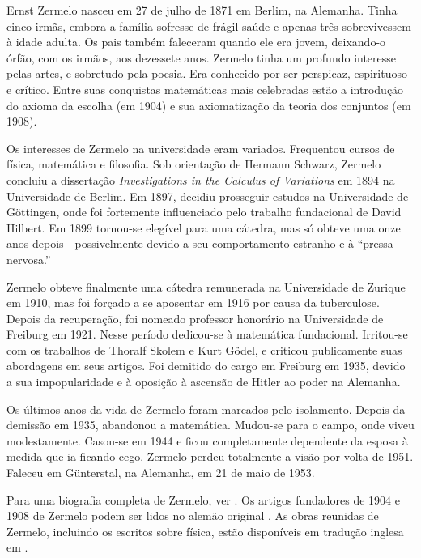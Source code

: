 \documentclass[../../../include/open-logic-section]{subfiles}
\begin{document}



Ernst Zermelo nasceu em 27 de julho de 1871 em Berlim, na Alemanha.
Tinha cinco irmãs, embora a família sofresse de frágil saúde e apenas
três sobrevivessem à idade adulta. Os pais também faleceram quando ele
era jovem, deixando-o órfão, com os irmãos, aos dezessete anos.
Zermelo tinha um profundo interesse pelas artes, e sobretudo pela
poesia. Era conhecido por ser perspicaz, espirituoso e crítico. Entre
suas conquistas matemáticas mais celebradas estão a introdução do
axioma da escolha (em 1904) e sua axiomatização da teoria dos
conjuntos (em 1908).

Os interesses de Zermelo na universidade eram variados. Frequentou
cursos de física, matemática e filosofia. Sob orientação de Hermann
Schwarz, Zermelo concluiu a dissertação \emph{Investigations in the
  Calculus of Variations} em 1894 na Universidade de Berlim. Em 1897,
decidiu prosseguir estudos na Universidade de G\"{o}ttingen, onde foi
fortemente influenciado pelo trabalho fundacional de David Hilbert.
Em 1899 tornou-se elegível para uma cátedra, mas só obteve uma onze
anos depois---possivelmente devido a seu comportamento estranho e à
``pressa nervosa.''

Zermelo obteve finalmente uma cátedra remunerada na Universidade de
Zurique em 1910, mas foi forçado a se aposentar em 1916 por causa da
tuberculose. Depois da recuperação, foi nomeado professor honorário na Universidade
de Freiburg em 1921. Nesse período
dedicou-se à matemática fundacional.  Irritou-se com os trabalhos de
Thoralf Skolem e Kurt G\"{o}del, e criticou publicamente suas
abordagens em seus artigos.  Foi demitido do cargo em Freiburg em
1935, devido a sua impopularidade e à oposição à ascensão de Hitler
ao poder na Alemanha.
 
Os últimos anos da vida de Zermelo foram marcados pelo isolamento.
Depois da demissão em 1935, abandonou a matemática. Mudou-se para
o campo, onde viveu modestamente. Casou-se em 1944 e ficou completamente
dependente da esposa à medida que ia ficando cego. Zermelo perdeu
totalmente a visão por volta de 1951. Faleceu em G\"{u}nterstal,
na Alemanha, em 21 de maio de 1953.

\begin{reading}
Para uma biografia completa de Zermelo, ver \citet{Ebbinghaus2015}.
Os artigos fundadores de 1904 e 1908 de Zermelo podem ser lidos no
alemão original \citep{Zermelo1904,Zermelo1908}.  As obras reunidas
de Zermelo, incluindo os escritos sobre física, estão disponíveis em
tradução inglesa em \citet{Ebbinghaus2010,Ebbinghaus2013}.
\end{reading}
\end{document}
